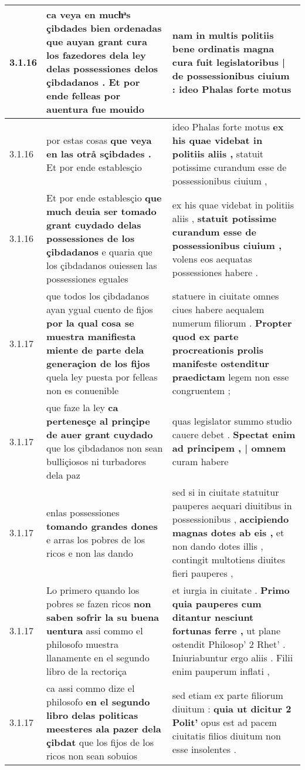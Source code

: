 \begin{tabular}{|p{1cm}|p{6.5cm}|p{6.5cm}|}
3.1.16 & ca veya en muchͣs çibdades bien ordenadas \textbf{ que auyan grant cura los fazedores dela ley delas possessiones delos çibdadanos . } Et por ende felleas por auentura fue mouido & nam in multis politiis bene ordinatis \textbf{ magna cura fuit legislatoribus | de possessionibus ciuium : } ideo Phalas forte motus \\\hline
3.1.16 & por estas cosas \textbf{ que veya en las otrå sçibdades . } Et por ende establesçio & ideo Phalas forte motus \textbf{ ex his quae videbat in politiis aliis , } statuit potissime curandum esse de possessionibus ciuium , \\\hline
3.1.16 & Et por ende establesçio \textbf{ que much deuia ser tomado grant cuydado delas possessiones de los çibdadanos } e quaria que los çibdadanos ouiessen las possessiones eguales & ex his quae videbat in politiis aliis , \textbf{ statuit potissime curandum esse de possessionibus ciuium , } volens eos aequatas possessiones habere . \\\hline
3.1.17 & que todos los çibdadanos ayan ygual cuento de fijos \textbf{ por la qual cosa se muestra manifiesta miente de parte dela generaçion de los fijos } quela ley puesta por felleas non es conuenible & statuere in ciuitate omnes ciues habere aequalem numerum filiorum . \textbf{ Propter quod ex parte procreationis prolis manifeste ostenditur praedictam } legem non esse congruentem ; \\\hline
3.1.17 & que faze la ley \textbf{ ca pertenesçe al prinçipe de auer grant cuydado } que los çibdadanos non sean bulliçiosos ni turbadores dela paz & quas legislator summo studio cauere debet . \textbf{ Spectat enim ad principem , | omnem } curam habere \\\hline
3.1.17 & enlas possessiones \textbf{ tomando grandes dones } e arras los pobres de los ricos e non las dando & sed si in ciuitate statuitur pauperes aequari diuitibus in possessionibus , \textbf{ accipiendo magnas dotes ab eis , } et non dando dotes illis , contingit multotiens diuites fieri pauperes , \\\hline
3.1.17 & Lo primero quando los pobres se fazen ricos \textbf{ non saben sofrir la su buena uentura } assi commo el philosofo muestra llanamente en el segundo libro de la rectoriça & et iurgia in ciuitate . \textbf{ Primo quia pauperes cum ditantur nesciunt fortunas ferre , } ut plane ostendit Philosop’ 2 Rhet’ . Iniuriabuntur ergo aliis . Filii enim pauperum inflati , \\\hline
3.1.17 & ca assi commo dize el philosofo \textbf{ en el segundo libro delas politicas meesteres ala pazer dela çibdat } que los fijos de los ricos non sean sobuios & sed etiam ex parte filiorum diuitum : \textbf{ quia ut dicitur 2 Polit’ } opus est ad pacem ciuitatis filios diuitum non esse insolentes . \\\hline

\end{tabular}
